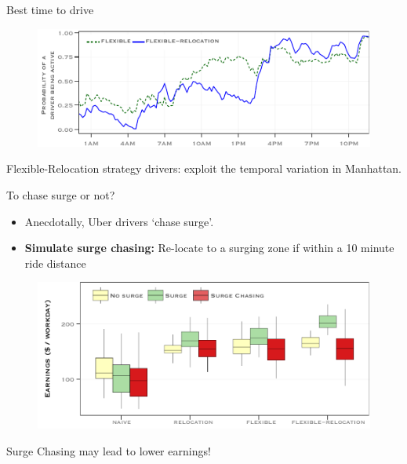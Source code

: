 \begin{frame}{Best time to drive}
\begin{figure}
	\centering
	\includegraphics[width=0.85\paperwidth]{figures/simulated_schedules.pdf}
\end{figure}
\alert{Flexible-Relocation strategy drivers: exploit the temporal variation in Manhattan.}
\end{frame}

\begin{frame}{To chase surge or not?}
\begin{itemize}
	\item Anecdotally, Uber drivers \textcolor{BlueGreen}{`chase surge'}.
	\pause
	\item \textbf{Simulate surge chasing:} Re-locate to a surging zone if within a 10 minute ride distance
\end{itemize}
\pause
\begin{figure}
	\centering
	\includegraphics[width=0.65\paperwidth]{figures/simulated_earnings.pdf}
\end{figure}
\alert{Surge Chasing may lead to lower earnings!}
\end{frame}